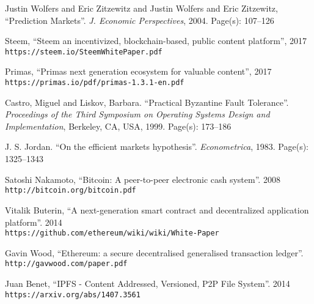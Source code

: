 \begin{thebibliography}{9}
Justin Wolfers and Eric Zitzewitz and Justin Wolfers and Eric Zitzewitz,
``Prediction Markets''. 
\textit{J. Economic Perspectives}, 2004. Page(s): 107--126

Steem, 
``Steem an incentivized, blockchain-based, public content platform'', 2017
\\\texttt{https://steem.io/SteemWhitePaper.pdf}


Primas, 
``Primas next generation ecosystem for valuable content'', 2017
\\\texttt{https://primas.io/pdf/primas-1.3.1-en.pdf}

Castro, Miguel and Liskov, Barbara. 
``Practical Byzantine Fault Tolerance''. 
\textit{Proceedings of the Third Symposium on Operating Systems Design and Implementation}, Berkeley, CA, USA, 1999. Page(s): 173--186

J. S. Jordan. 
``On the efficient markets hypothesis''. 
\textit{Econometrica}, 1983. Page(s): 1325--1343


Satoshi Nakamoto, 
``Bitcoin: A peer-to-peer electronic cash system''. 2008
\\\texttt{http://bitcoin.org/bitcoin.pdf} 

Vitalik Buterin, 
``A next-generation smart contract and decentralized application platform''. 2014
\\\texttt{https://github.com/ethereum/wiki/wiki/White-Paper} 

Gavin Wood, 
``Ethereum: a secure decentralised generalised transaction ledger''. 
\\\texttt{http://gavwood.com/paper.pdf} 

Juan Benet, 
``IPFS - Content Addressed, Versioned, P2P File System''. 2014
\\\texttt{https://arxiv.org/abs/1407.3561} 

\end{thebibliography}
 
